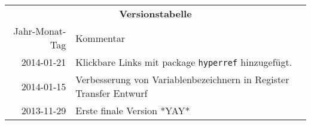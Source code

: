 \begin{table}[htp]
\centering
\begin{tabular}{rl}
\multicolumn{2}{c}{\textbf{Versionstabelle}} \\
Jahr-Monat-Tag & Kommentar \\ \hline
2014-01-21 & Klickbare Links mit package \texttt{hyperref} hinzugefügt. \\
2014-01-15 & Verbesserung von Variablenbezeichnern in Register Transfer Entwurf \\
2013-11-29 & Erste finale Version *YAY* \\
\end{tabular}
\end{table}